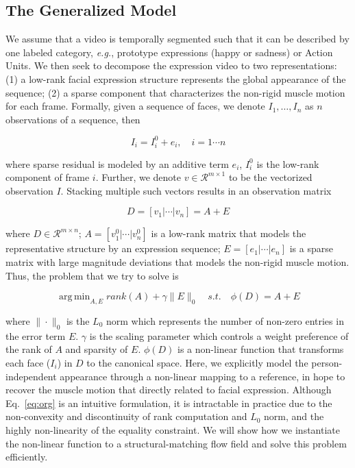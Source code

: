 \documentclass[journal]{IEEEtran}
\DeclareMathOperator*{\argmin}{arg\,min}
\begin{document}
\subsection{The Generalized Model} 
We assume that a video is temporally segmented such that it can be described by one labeled category, \textit{e.g.}, prototype expressions (happy or sadness) or Action Units. We then seek to decompose the expression video to two representations: (1) a low-rank facial expression structure represents the global appearance of the sequence; (2) a sparse component that characterizes the non-rigid muscle motion for each frame. Formally, given a sequence of faces, we denote $I_1, \ldots, I_n$ as $n$ observations of a sequence, then

\begin{equation}
I_i = I^{0}_i + e_i,\quad i = 1\cdots n
\end{equation}

\noindent where sparse residual is modeled by an additive term $e_i$, $I^{0}_i$ is the low-rank component of frame $i$. Further, we denote $v\in\mathscr{R}^{m\times 1}$ to be the vectorized observation $I$. Stacking multiple such vectors results in an observation matrix

\begin{equation}
D = [v_1 | \cdots | v_n] = A + E
\end{equation}

\noindent where $D\in\mathscr{R}^{m\times n}$; $A = [v^{0}_{1} | \cdots | v^{0}_{n}]$ is a low-rank matrix that models the representative structure by an expression sequence; $E = [e_{1} | \cdots | e_{n}]$ is a sparse matrix with large magnitude deviations that models the non-rigid muscle motion. Thus, the problem that we try to solve is

\begin{equation} \label{eq:org}
\argmin_{A,E} rank(A)+\gamma \|E\|_0  \quad s.t. \quad \phi (D) = A + E 
\end{equation}

\noindent where $\|\cdot\|_0$ is the $L_0$ norm which represents the number of non-zero entries in the error term $E$. $\gamma$ is the scaling parameter which controls a weight preference of the rank of $A$ and sparsity of $E$. $\phi (D)$ is a non-linear function that transforms each face ($I_i$) in $D$ to the canonical space. Here, we explicitly model the person-independent appearance through a non-linear mapping to a reference, in hope to recover the muscle motion that directly related to facial expression. Although Eq.~\ref{eq:org} is an intuitive formulation, it is intractable in practice due to the non-convexity and discontinuity of rank computation and $L_0$ norm, and the highly non-linearity of the equality constraint. We will show how we instantiate the non-linear function to a structural-matching flow field and solve this problem efficiently.
\end{document}
